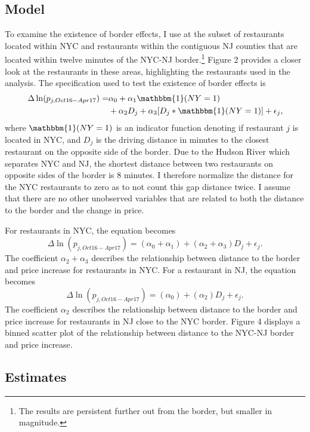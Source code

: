 \documentclass[11pt]{article}
\begin{document}
\subsection{Model}
 To examine the existence of border effects, I use at the subset of restaurants located within NYC and restaurants within the contiguous NJ counties that are located within twelve minutes of the NYC-NJ border.\footnote{The results are persistent further out from the border, but smaller in magnitude.} Figure 2 provides a closer look at the restaurants in these areas, highlighting the restaurants used in the analysis. The specification used to test the existence of border effects is  
\begin{equation}
\begin{split}
\Delta \ln (p_{j,Oct16-Apr17})  = & \alpha_0 + \alpha_1  \mathbbm{1}(NY=1)  \\
& + \alpha_2 D_{j} + \alpha_3[D_j * \mathbbm{1}(NY=1)]  + \epsilon_{j}, 
\end{split}
\end{equation}
where  $\mathbbm{1}(NY=1)$ is an indicator function denoting if restaurant $j$ is located in NYC, and $D_j$ is the driving distance in minutes to the closest restaurant on the opposite side of the border. Due to the Hudson River which separates NYC and NJ, the shortest distance between two restaurants on opposite sides of the border is 8 minutes. I therefore normalize the distance for the NYC restaurants to zero as to not count this gap distance twice. I assume that there are no other unobserved variables that are related to both the distance to the border and the change in price. 

For restaurants in NYC, the equation becomes 
$$ \Delta \ln (p_{j,Oct16-Apr17})  = (\alpha_0 +\alpha_1) +  (\alpha_2 + \alpha_3) D_j  + \epsilon_{j}.   $$
The coefficient $\alpha_2 + \alpha_3$ describes the relationship between distance to the border and price increase for restaurants in NYC. For a restaurant in NJ, the equation becomes 
$$
\Delta \ln (p_{j,Oct16-Apr17})  = (\alpha_0 ) +  (\alpha_2 ) D_j  + \epsilon_{j}.
$$
The coefficient $\alpha_2$ describes the relationship between distance to the border and price increase for restaurants in NJ close to the NYC border. Figure 4 displays a binned scatter plot of the relationship between distance to the NYC-NJ border and price increase. 

\subsection{Estimates}
\end{document}
